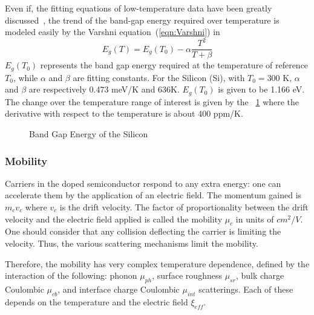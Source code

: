 Even if, the fitting equations of low-temperature data have been greatly discussed~\cite{Varshni1967,Allen1976,Manoogian1979,Donnell1991}, the trend of the band-gap energy required over temperature is modeled easily by the Varshni equation~(\ref{eqn:Varshni}) in~\cite{Varshni1967}
\begin{equation}
\label{eqn:Varshni}
E_g(T) = E_g(T_0) - \alpha \frac{T^2}{T+\beta}
\end{equation}
\(E_g(T_0) \) represents the band gap energy required at the temperature of reference \(T_0 \), while \(\alpha \) and \(\beta \) are fitting constants. For the Silicon (Si), with \(T_0 = \)300 K, \(\alpha \) and \(\beta \) are respectively 0.473 meV/K and 636K. \(E_g(T_0) \) is given to be 1.166 eV. The change over the temperature range of interest is given by the \figurename~\ref{fig:bandgap} where the derivative with respect to the temperature is about 400 ppm/K.

\begin{figure}[!ht]
	\centering
	\resizebox{0.5\textwidth}{!}{
		
	}
	\caption{Band Gap Energy of the Silicon }
	\label{fig:bandgap}
\end{figure}

\subsubsection{Mobility}               %
\label{sec:mobility}
Carriers in the doped semiconductor respond to any extra energy: one can accelerate them by the application of an electric field. The momentum gained is \(m_c v_c \) where \(v_c \) is the drift velocity. The factor of proportionality between the drift velocity and the electric field applied is called the mobility \(\mu_c \) in units of \(cm^2/V \). One should consider that any collision deflecting the carrier is limiting the velocity. Thus, the various scattering mechanisms limit the mobility.

Therefore, the mobility has very complex temperature dependence, defined by the interaction of the following: phonon \(\mu_{ph} \), surface roughness \(\mu_{sr} \), bulk charge Coulombic \(\mu_{cb} \), and interface charge Coulombic  \(\mu_{int} \) scatterings. Each of these depends on the temperature and the electric field \(\xi_{eff} \).

